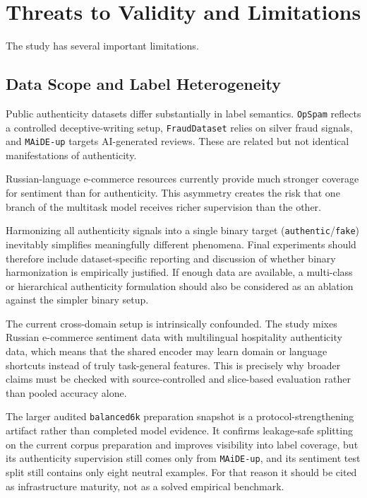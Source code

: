 \documentclass[12pt,a4paper]{article}
\begin{document}
\section{Threats to Validity and Limitations}

The study has several important limitations.

\subsection{Data Scope and Label Heterogeneity}

Public authenticity datasets differ substantially in label semantics. \texttt{OpSpam} reflects a controlled deceptive-writing setup, \texttt{FraudDataset} relies on silver fraud signals, and \texttt{MAiDE-up} targets AI-generated reviews. These are related but not identical manifestations of authenticity.

Russian-language e-commerce resources currently provide much stronger coverage for sentiment than for authenticity. This asymmetry creates the risk that one branch of the multitask model receives richer supervision than the other.

Harmonizing all authenticity signals into a single binary target (\texttt{authentic}/\texttt{fake}) inevitably simplifies meaningfully different phenomena. Final experiments should therefore include dataset-specific reporting and discussion of whether binary harmonization is empirically justified. If enough data are available, a multi-class or hierarchical authenticity formulation should also be considered as an ablation against the simpler binary setup.

The current cross-domain setup is intrinsically confounded. The study mixes Russian e-commerce sentiment data with multilingual hospitality authenticity data, which means that the shared encoder may learn domain or language shortcuts instead of truly task-general features. This is precisely why broader claims must be checked with source-controlled and slice-based evaluation rather than pooled accuracy alone.

The larger audited \texttt{balanced6k} preparation snapshot is a protocol-strengthening artifact rather than completed model evidence. It confirms leakage-safe splitting on the current corpus preparation and improves visibility into label coverage, but its authenticity supervision still comes only from \texttt{MAiDE-up}, and its sentiment test split still contains only eight neutral examples. For that reason it should be cited as infrastructure maturity, not as a solved empirical benchmark.
\end{document}
